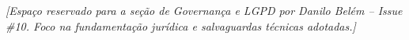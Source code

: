 \noindent\textit{[Espaço reservado para a seção de Governança e LGPD por Danilo Belém -- Issue \#10. Foco na fundamentação jurídica e salvaguardas técnicas adotadas.]}
